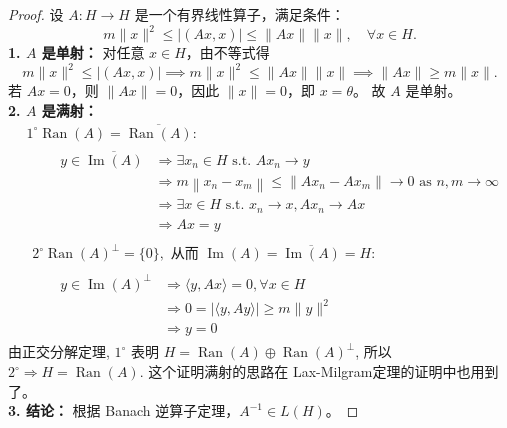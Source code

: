 \documentclass[lang=cn,newtx,10pt,scheme=chinese,thmcnt=chapter]{elegantbook}
\begin{document}
\begin{proof}
设 \( A : {H} \to {H} \) 是一个有界线性算子，满足条件：
\[
m\|x\|^2 \leqslant |(Ax, x)| \leqslant \|Ax\|\|x\|, \quad \forall x \in {H}.
\]
\textbf{1. \( A \) 是单射：}  
对任意 \( x \in {H} \)，由不等式得
\[
m\|x\|^2 \leqslant |(Ax, x)| \implies m\|x\|^2 \leqslant \|Ax\|\|x\| \implies \|Ax\| \geqslant m\|x\|.
\]
若 \( Ax = 0 \)，则 \( \|Ax\| = 0 \)，因此 \( \|x\| = 0 \)，即 \( x = \theta \)。  
故 \( A \) 是单射。\\
\textbf{2. \( A \) 是满射：}  
\begin{equation*}
\begin{aligned}
& 1^{\circ} \operatorname{Ran}(A)=\overline{\operatorname{Ran}(A)}: \\
& \qquad \begin{aligned}
y \in \overline{\operatorname{Im}(A)} & \Rightarrow \exists x_n \in H \text { s.t. } A x_n \rightarrow y \\
& \Rightarrow m\left\|x_n-x_m\right\| \leqslant\left\|A x_n-A x_m\right\| \rightarrow 0 \text { as } n, m \rightarrow \infty \\
& \Rightarrow \exists x \in H \text { s.t. } x_n \rightarrow x, A x_n \rightarrow A x \\
& \Rightarrow A x=y
\end{aligned} \\
& \begin{aligned}
2^{\circ} \operatorname{Ran}(A)^{\perp}=\{0\}, \text { 从而 } \operatorname{Im}(A)=\overline{\operatorname{Im}(A)}=H:
\end{aligned} \\
& \qquad \begin{aligned}
y \in \operatorname{Im}(A)^{\perp} & \Rightarrow\langle y, A x\rangle=0, \forall x \in H \\
& \Rightarrow 0=|\langle y, A y\rangle| \geqslant m\|y\|^2 \\
& \Rightarrow y=0
\end{aligned}
\end{aligned}
\end{equation*}
由正交分解定理, $1^{\circ}$ 表明 $H=\operatorname{Ran}(A) \oplus \operatorname{Ran}(A)^{\perp}$, 所以 $2^{\circ} \Rightarrow H=\operatorname{Ran}(A)$. 这个证明满射的思路在 Lax-Milgram定理的证明中也用到了。\\
\textbf{3. 结论：}  
根据 Banach 逆算子定理，\( A^{-1} \in L({H}) \)。
\end{proof}
\end{document}
